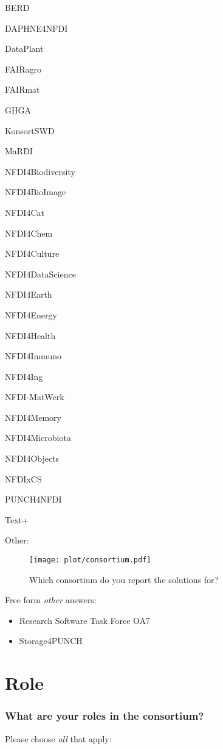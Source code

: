 \documentclass[headsepline,titlepage,twoside,12pt,toc=flat,headings=normal]{scrreprt}
\newcommand{\question}[1]{\subsubsection{#1}}
\newcommand{\otherbox}{\fbox{\phantom{This is how big an answer would be.}}}
\begin{document}
\begin{answers}
\item \acs{BERD}
\item DAPHNE4NFDI
\item DataPlant
\item \acs{FAIRagro}
\item \acs{FAIRmat}
\item \acs{GHGA}
\item KonsortSWD
\item \acs{MaRDI}
\item NFDI4Biodiversity
\item NFDI4BioImage
\item NFDI4Cat
\item NFDI4Chem
\item NFDI4Culture
\item NFDI4DataScience
\item NFDI4Earth
\item NFDI4Energy
\item NFDI4Health
\item NFDI4Immuno
\item NFDI4Ing
\item NFDI-MatWerk
\item NFDI4Memory
\item NFDI4Microbiota
\item NFDI4Objects
\item NFDIxCS
\item \acs{PUNCH}4NFDI
\item Text+
\item Other: \otherbox
\end{answers}

\begin{figure}[h!]
\caption{Which consortium do you report the solutions for?}
\label{fig:consortium}
\texttt{[image: plot/consortium.pdf]}
\end{figure}

Free form \emph{other} answers:
\begin{itemize}
\item Research Software Task Force OA7
\item Storage4PUNCH
\end{itemize}

\newpage
\section{Role}

\question{What are your roles in the consortium?}
Please choose \emph{all} that apply:
\end{document}
